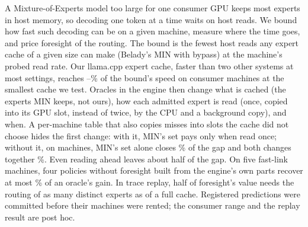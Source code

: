 A Mixture-of-Experts model too large for one consumer GPU keeps most experts in host memory, so decoding one token
at a time waits on host reads. We bound how fast such decoding can be on a given machine, measure where the
time goes, and price foresight of the routing. The bound is the fewest host reads any expert cache of
a given size can make (Belady's MIN with bypass) at the machine's probed read rate. Our llama.cpp expert cache,
faster than two other systems at most settings, reaches \dcShareMinLowMin--\dcShareMinLowMax\% of the bound's speed on
consumer machines at the smallest cache we test. Oracles in the engine then change what is cached (the experts MIN
keeps, not ours), how each admitted expert is read (once, copied into its GPU slot, instead of twice, by the CPU
and a background copy), and when. A per-machine table that also copies misses into slots the cache did
not choose hides the first change: with it, MIN's set pays only when read once; without it, on \dpNWord{} machines,
MIN's set alone closes \dmCpuSetaloneZeroLow\% of the gap and both changes together \dmCpuTogetherZeroLow\%. Even
reading ahead leaves about half of the gap. On five fast-link machines, four policies without foresight built from the engine's own parts recover
at most \olCapLowMax\% of an oracle's gain. In trace replay, half of foresight's value needs the routing of as many distinct
experts as \dcMed{} of a full cache. Registered predictions were committed before their machines were rented; the
consumer range and the replay result are post hoc.
